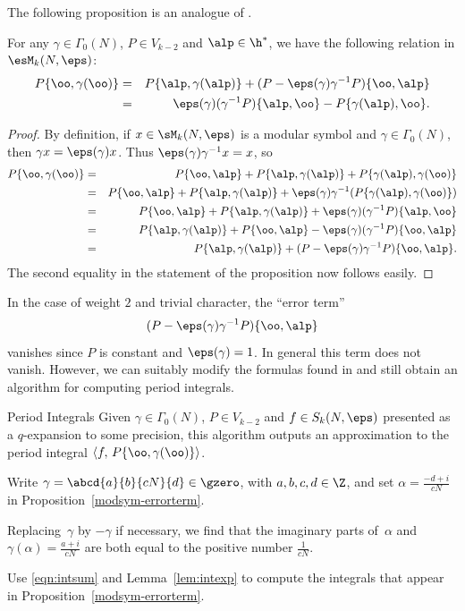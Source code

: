 The following proposition is an
analogue of \cite[Prop. 2.1.1(5)]{cremona:algs}.
\begin{proposition}\label{modsym-errorterm}
For any $\gamma\in \Gamma_0(N)$, $P\in V_{k-2}$ and $\alp\in\h^*$,
we have the following relation in $\esM_k(N,\eps)$:
\begin{eqnarray}
P\{\oo, \gamma(\oo)\}
  &=& P\{\alp,\gamma(\alp)\} + (P - \eps(\gamma)\gamma^{-1}P)\{\oo,\alp\}\\
  &=& \eps(\gamma)(\gamma^{-1}P)\{\alp, \oo\} - P\{\gamma(\alp),\oo\}.
\end{eqnarray}
\end{proposition}
\begin{proof}
By definition, if $x\in\sM_k(N,\eps)$ is a modular symbol 
and $\gamma\in\Gamma_0(N)$, then $\gamma{}x=\eps(\gamma)x$.
Thus $\eps(\gamma)\gamma^{-1}x=x$, so 
\begin{eqnarray*}
P\{\oo, \gamma(\oo)\}
  &=& P\{\oo,\alp\} + P\{\alp,\gamma(\alp)\} + P\{\gamma(\alp),\gamma(\oo)\}\\
  &=& P\{\oo,\alp\} + P\{\alp,\gamma(\alp)\} + \eps(\gamma)\gamma^{-1}(P\{\gamma(\alp),\gamma(\oo)\})\\
  &=& P\{\oo,\alp\} + P\{\alp,\gamma(\alp)\} + \eps(\gamma)(\gamma^{-1}P)\{\alp, \oo\}\\
  &=& P\{\alp,\gamma(\alp)\} + P\{\oo,\alp\}  - \eps(\gamma)(\gamma^{-1}P)\{\oo, \alp\}\\
  &=& P\{\alp,\gamma(\alp)\} + (P - \eps(\gamma)\gamma^{-1}P)\{\oo,\alp\}.
\end{eqnarray*}
The second equality in the statement of the proposition now follows easily.
\end{proof}
In the case of weight $2$ and trivial character,
the ``error term'' 
\begin{equation}\label{eqn:erroreqn}
(P - \eps(\gamma)\gamma^{-1}P)\{\oo,\alp\}
\end{equation}
vanishes since $P$ is constant and $\eps(\gamma)=1$.  In general this term does 
not vanish.  However, we can suitably modify the formulas 
found in \cite[2.10]{cremona:algs} and still obtain an algorithm
for computing period integrals.

\begin{algorithm}{Period Integrals}
Given $\gamma\in\Gamma_0(N)$,  $P\in V_{k-2}$ and 
 $f\in S_k(N,\eps)$ 
presented as a $q$-expansion to some precision,
this algorithm outputs an approximation to
 the period integral
$\langle f, \,P\{\oo, \gamma(\oo)\}\rangle$.
\begin{steps}
\item Write $\gamma=\abcd{\hfill a}{b}{cN}{d}\in\gzero$, with $a,b,c,d\in\Z$,
and set $\alpha = \frac{-d+i}{cN}$ in Proposition~\ref{modsym-errorterm}.
\item 
Replacing~$\gamma$ by $-\gamma$ if necessary,
we find that the imaginary parts of~$\alpha$ and 
$\gamma(\alpha)=\frac{a+i}{cN}$
are both equal to the positive number $\frac{1}{cN}$.
\item 
Use \eqref{eqn:intsum} and Lemma~\ref{lem:intexp} to 
compute the integrals that appear in
Proposition~\ref{modsym-errorterm}.
\end{steps}
\end{algorithm}

